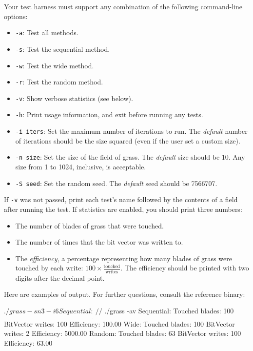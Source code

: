 \documentclass[11pt]{article}
\begin{document}
Your test harness must support any combination of the following command-line options:

\begin{itemize}
    \item \texttt{-a}: Test all methods.
    \item \texttt{-s}: Test the sequential method.
    \item \texttt{-w}: Test the wide method.
    \item \texttt{-r}: Test the random method.
    \item \texttt{-v}: Show verbose statistics (see below).
    \item \texttt{-h}: Print usage information, and exit before running any tests.
    \item \texttt{-i iters}: Set the maximum number of iterations to run. The \emph{default} number of iterations should be the size squared (even if the user set a custom size).
    \item \texttt{-n size}: Set the size of the field of grass. The \emph{default} size should be 10. Any size from 1 to 1024, inclusive, is acceptable.
    \item \texttt{-S seed}: Set the random seed. The \emph{default} seed should be 7566707.
\end{itemize}

If \texttt{-v} was not passed, print each test's name followed by the contents of a field after running the test. If statistics are enabled, you should print three numbers:

\begin{itemize}
    \item The number of blades of grass that were touched.
    \item The number of times that the bit vector was written to.
    \item The \emph{efficiency}, a percentage representing how many blades of grass were touched by each write: $100 \times \frac{\text{touched}}{\text{writes}}$. The efficiency should be printed with two digits after the decimal point.
\end{itemize}

Here are examples of output. For further questions, consult the reference binary:

\begin{shlisting}{}
$ ./grass -sn 3 -i 6
Sequential:
___
___
///
$ ./grass -av
Sequential:
  Touched blades:     100
  BitVector writes:   100
  Efficiency:         100.00%
Wide:
  Touched blades:     100
  BitVector writes:     2
  Efficiency:        5000.00%
Random:
  Touched blades:      63
  BitVector writes:   100
  Efficiency:          63.00%
\end{shlisting}
\end{document}
